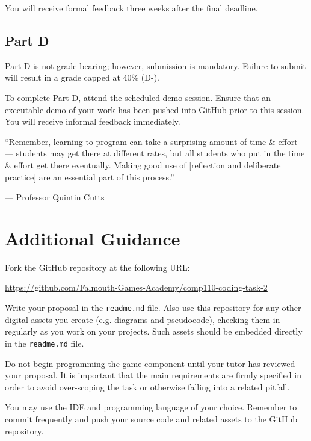 \documentclass{../fal_assignment}
\begin{document}
You will receive formal feedback three weeks after the final deadline.

\subsection*{Part D}

Part D is not grade-bearing; however, submission is mandatory. Failure to submit will result in a grade capped at 40\% (D-).

To complete Part D, attend the scheduled demo session. Ensure that an executable demo of your work has been pushed into GitHub prior to this session. You will receive informal feedback immediately.

\begin{marginquote}
    ``Remember, learning to program can take a surprising amount of time \& effort --- students may get there at different rates, but all students who put in the time \& effort get there eventually. Making good use of [reflection and deliberate practice] are an essential part of this process.''
    
    --- Professor Quintin Cutts
\end{marginquote}

\newpage

\section*{Additional Guidance}

Fork the GitHub repository at the following URL:

\indent \url{https://github.com/Falmouth-Games-Academy/comp110-coding-task-2}

Write your proposal in the \texttt{readme.md} file. Also use this repository for any other digital assets you create (e.g. diagrams and pseudocode), checking them in regularly as you work on your projects. Such assets should be embedded directly in the \texttt{readme.md} file.

Do not begin programming the game component until your tutor has reviewed your proposal. It is important that the main requirements are firmly specified in order to avoid over-scoping the task or otherwise falling into a related pitfall.

You may use the IDE and programming language of your choice. Remember to commit frequently and push your source code and related assets to the GitHub repository.
\end{document}

